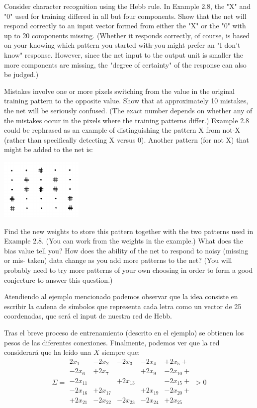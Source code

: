 \begin{problem}[3]
\ppart Consider character recognition using the Hebb rule. In Example 2.8, the "X" and
"0" used for training differed in all but four components. Show that the net will
respond correctly to an input vector formed from either the "X" or the "0" with
up to 20 components missing. (Whether it responds correctly, of course, is based on
your knowing which pattern you started with-you might prefer an "I don't know"
response. However, since the net input to the output unit is smaller the more components are missing, the "degree of certainty" of the response can also be judged.)

\ppart Mistakes involve one or more pixels switching from the value in the original
training pattern to the opposite value. Show that at approximately 10 mistakes, the
net will be seriously confused. (The exact number depends on whether any of the
mistakes occur in the pixels where the training patterns differ.)
Example 2.8 could be rephrased as an example of distinguishing the pattern X
from not-X (rather than specifically detecting X versus 0). Another pattern (for not X) that might be added to the net is:

\begin{center}
\includegraphics[width=0.3\textwidth]{img/pattern.png}
\end{center}

\ppart Find the new weights to store this pattern together with the two patterns used in
Example 2.8. (You can work from the weights in the example.) What does the bias
value tell you? How does the ability of the net to respond to noisy (missing or mis-
taken) data change as you add more patterns to the net? (You will probably need to
try more patterns of your own choosing in order to form a good conjecture to answer
this question.)

\solution
Atendiendo al ejemplo mencionado podemos observar que la idea consiste en escribir la cadena de símbolos que representa cada letra como un vector de 25 coordenadas, que será el input de nuestra red de Hebb.

Tras el breve proceso de entrenamiento (descrito en el ejemplo) se obtienen los pesos de las diferentes conexiones. Finalmente, podemos ver que la red considerará que ha leído una $X$ siempre que:
\[Σ = \begin{array}{ccccc}
2x_1& -2x_2 & -2x_3 & -2x_4 & +2x_5 +\\
-2x_6 & + 2x_7 &  & + 2x_9 &- 2x_{10} +\\
-2x_{11} & & +2x_{13} & & -2x_{15} + \\
-2x_{16} & +2x_{17} & & +2x_{19} & -2x_{20} + \\
+2x_{21} & -2x_{22} & -2x_{23} & -2x_{24} & +2x_{25} \\
\end{array} > 0\]


\end{problem}
